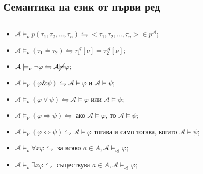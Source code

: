 \documentclass{article}
\begin{document}
\subsection*{Семантика на език от първи ред}

\begin{prop}
$\ $

\begin{itemize}
\item $\mathcal{A} \models_\nu p(\tau_1, \tau_2, \ldots, \tau_n) \leftrightharpoons <\tau_1, \tau_2, \ldots, \tau_n> \in p^\mathcal{A}$;
\item $\mathcal{A} \models_\nu (\tau_1 \doteq \tau_2) \leftrightharpoons \tau_1^\mathcal{A}[\nu] = \tau_2^\mathcal{A}[\nu]$;
\item $\mathcal{A} \models_\nu \neg\varphi \leftrightharpoons \mathcal{A} \cancel{\models} \varphi$;
\item $\mathcal{A} \models_\nu (\varphi \& \psi) \leftrightharpoons \mathcal{A} \models \varphi$ и $\mathcal{A} \models \psi$;
\item $\mathcal{A} \models_\nu (\varphi \lor \psi) \leftrightharpoons \mathcal{A} \models \varphi$ или $ \mathcal{A} \models \psi$;
\item $\mathcal{A} \models_\nu (\varphi \Rightarrow \psi) \leftrightharpoons$ ако $\mathcal{A} \models \varphi$, то $ \mathcal{A} \models \psi$;
\item $\mathcal{A} \models_\nu (\varphi \Leftrightarrow \psi) \leftrightharpoons \mathcal{A} \models \varphi$ тогава и само тогава, когато $ \mathcal{A} \models \psi$;
\item $\mathcal{A} \models_\nu \forall x\varphi \leftrightharpoons$ за всяко $a \in A, \mathcal{A} \models_{\nu^x_a} \varphi$;
\item $\mathcal{A} \models_\nu \exists x\varphi \leftrightharpoons$ съществува $a \in A, \mathcal{A} \models_{\nu^x_a} \varphi$;
\end{itemize}
\end{prop}
\end{document}
